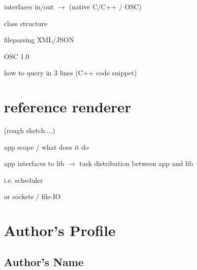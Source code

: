 \documentclass{article}
\begin{document}
interfaces in/out $\rightarrow$ (native C/C++ / OSC)

class structure


fileparsing XML/JSON

OSC 1.0

how to query in 3 lines (C++ code snippet)

\section{reference renderer }%

(rough sketch....)

app scope / what does it do

app interfaces to lib $\rightarrow$ task distribution between app and lib

i.e. scheduler

or sockets / file-IO




\printbibliography

% 

\section{Author's Profile}


\subsection*{Author's Name}
\end{document}
